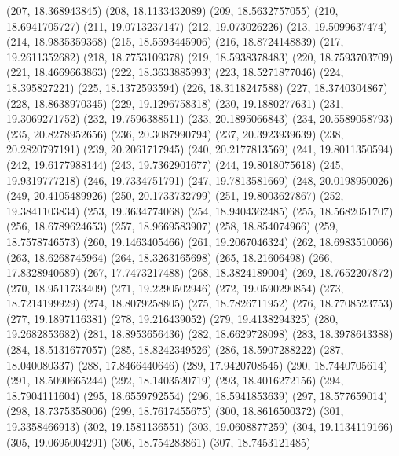 {					(207, 18.368943845)
					(208, 18.1133432089)
					(209, 18.5632757055)
					(210, 18.6941705727)
					(211, 19.0713237147)
					(212, 19.073026226)
					(213, 19.5099637474)
					(214, 18.9835359368)
					(215, 18.5593445906)
					(216, 18.8724148839)
					(217, 19.2611352682)
					(218, 18.7753109378)
					(219, 18.5938378483)
					(220, 18.7593703709)
					(221, 18.4669663863)
					(222, 18.3633885993)
					(223, 18.5271877046)
					(224, 18.395827221)
					(225, 18.1372593594)
					(226, 18.3118247588)
					(227, 18.3740304867)
					(228, 18.8638970345)
					(229, 19.1296758318)
					(230, 19.1880277631)
					(231, 19.3069271752)
					(232, 19.7596388511)
					(233, 20.1895066843)
					(234, 20.5589058793)
					(235, 20.8278952656)
					(236, 20.3087990794)
					(237, 20.3923939639)
					(238, 20.2820797191)
					(239, 20.2061717945)
					(240, 20.2177813569)
					(241, 19.8011350594)
					(242, 19.6177988144)
					(243, 19.7362901677)
					(244, 19.8018075618)
					(245, 19.9319777218)
					(246, 19.7334751791)
					(247, 19.7813581669)
					(248, 20.0198950026)
					(249, 20.4105489926)
					(250, 20.1733732799)
					(251, 19.8003627867)
					(252, 19.3841103834)
					(253, 19.3634774068)
					(254, 18.9404362485)
					(255, 18.5682051707)
					(256, 18.6789624653)
					(257, 18.9669583907)
					(258, 18.854074966)
					(259, 18.7578746573)
					(260, 19.1463405466)
					(261, 19.2067046324)
					(262, 18.6983510066)
					(263, 18.6268745964)
					(264, 18.3263165698)
					(265, 18.21606498)
					(266, 17.8328940689)
					(267, 17.7473217488)
					(268, 18.3824189004)
					(269, 18.7652207872)
					(270, 18.9511733409)
					(271, 19.2290502946)
					(272, 19.0590290854)
					(273, 18.7214199929)
					(274, 18.8079258805)
					(275, 18.7826711952)
					(276, 18.7708523753)
					(277, 19.1897116381)
					(278, 19.216439052)
					(279, 19.4138294325)
					(280, 19.2682853682)
					(281, 18.8953656436)
					(282, 18.6629728098)
					(283, 18.3978643388)
					(284, 18.5131677057)
					(285, 18.8242349526)
					(286, 18.5907288222)
					(287, 18.040080337)
					(288, 17.8466440646)
					(289, 17.9420708545)
					(290, 18.7440705614)
					(291, 18.5090665244)
					(292, 18.1403520719)
					(293, 18.4016272156)
					(294, 18.7904111604)
					(295, 18.6559792554)
					(296, 18.5941853639)
					(297, 18.577659014)
					(298, 18.7375358006)
					(299, 18.7617455675)
					(300, 18.8616500372)
					(301, 19.3358466913)
					(302, 19.1581136551)
					(303, 19.0608877259)
					(304, 19.1134119166)
					(305, 19.0695004291)
					(306, 18.754283861)
					(307, 18.7453121485)
}

